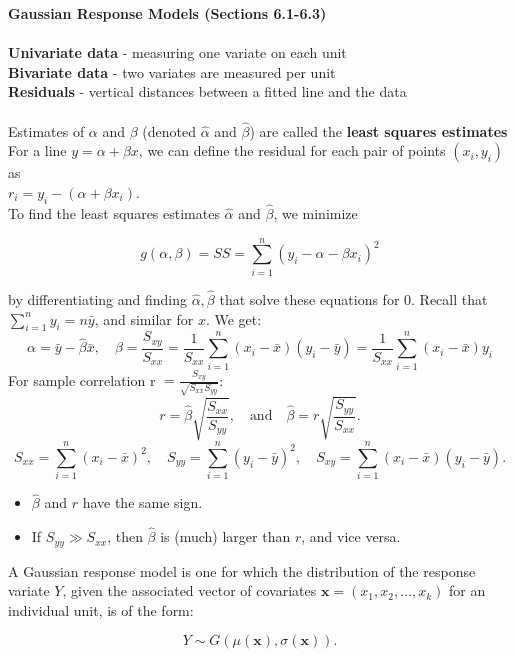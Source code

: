 \documentclass[a4paper,12pt]{article}
\begin{document}
\newpage
\textbf{Gaussian Response Models (Sections 6.1-6.3)}
\\
\\\textbf{Univariate data} - measuring one variate on each unit
\textbf{\\Bivariate data} - two variates are measured per unit
\\\textbf{Residuals} - vertical distances between a fitted line and the data
\\
\\ Estimates of $\alpha$ and $\beta$ (denoted $\hat{\alpha}$ and $\hat{\beta}$) are called the \textbf{least squares estimates}
\\ For a line \(y = \alpha + \beta x\), we can define the residual for each pair of points \((x_i, y_i)\) as 
\\\(r_i = y_i - (\alpha + \beta x_i)\).
\\To find the least squares estimates \(\hat{\alpha}\) and \(\hat{\beta}\), we minimize

\[
g(\alpha, \beta) = SS = \sum_{i=1}^{n} \left( y_i - \alpha - \beta x_i \right)^2
\]

by differentiating and finding \(\hat{\alpha}, \hat{\beta}\) that solve these equations for \(0\). Recall that \(\sum_{i=1}^{n} y_i = n\bar{y}\), and similar for \(x\). We get:
\[
\alpha = \bar{y} - \hat{\beta} \bar{x}, \quad \beta = \frac{S_{xy}}{S_{xx}} = \frac{1}{S_{xx}} \sum_{i=1}^n (x_i - \bar{x})(y_i - \bar{y}) 
= \frac{1}{S_{xx}} \sum_{i=1}^n (x_i - \bar{x})y_i
\]
For sample correlation r $= \frac{S_{xy}}{\sqrt{S_{xx} S_{yy}}}$:  
\[
r = \hat{\beta} \sqrt{\frac{S_{xx}}{S_{yy}}}, \quad \text{and} \quad \hat{\beta} = r \sqrt{\frac{S_{yy}}{S_{xx}}}.
\]
\[
S_{xx} = \sum_{i=1}^{n} (x_i - \bar{x})^2, \quad 
S_{yy} = \sum_{i=1}^n (y_i - \bar{y})^2, \quad
S_{xy} = \sum_{i=1}^{n} (x_i - \bar{x})(y_i - \bar{y}).
\]

\begin{itemize}
    \item \(\hat{\beta}\) and \(r\) have the same sign.
    \item If \(S_{yy} \gg S_{xx}\), then \(\hat{\beta}\) is (much) larger than \(r\), and vice versa.
\end{itemize}

A Gaussian response model is one for which the distribution of the response variate \(Y\), given the associated vector of covariates \(\mathbf{x} = (x_1, x_2, \dots, x_k)\) for an individual unit, is of the form:

\[
Y \sim G(\mu(\mathbf{x}), \sigma(\mathbf{x})).
\]
\end{document}
